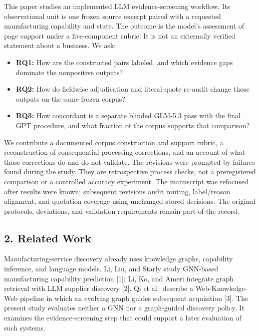 \documentclass[10pt]{article}
\providecommand{\tightlist}{\setlength{\itemsep}{0pt}\setlength{\parskip}{0pt}}
\begin{document}
This paper studies an implemented LLM evidence-screening workflow. Its observational unit is one frozen source excerpt paired with a requested manufacturing capability and state. The outcome is the model's assessment of page support under a five-component rubric. It is not an externally verified statement about a business. We ask:

\begin{itemize}
\tightlist
\item
  \textbf{RQ1:} How are the constructed pairs labeled, and which evidence gaps dominate the nonpositive outputs?
\item
  \textbf{RQ2:} How do fieldwise adjudication and literal-quote re-audit change those outputs on the same frozen corpus?
\item
  \textbf{RQ3:} How concordant is a separate blinded GLM-5.3 pass with the final GPT procedure, and what fraction of the corpus supports that comparison?
\end{itemize}

We contribute a documented corpus construction and support rubric, a reconstruction of consequential processing corrections, and an account of what those corrections do and do not validate. The revisions were prompted by failures found during the study. They are retrospective process checks, not a preregistered comparison or a controlled accuracy experiment. The manuscript was refocused after results were known; subsequent revisions audit routing, label/reason alignment, and quotation coverage using unchanged stored decisions. The original protocols, deviations, and validation requirements remain part of the record.

\hypertarget{related-work}{%
\subsection{2. Related Work}\label{related-work}}

Manufacturing-service discovery already uses knowledge graphs, capability inference, and language models. Li, Liu, and Starly study GNN-based manufacturing capability prediction {[}1{]}; Li, Ko, and Ameri integrate graph retrieval with LLM supplier discovery {[}2{]}. Qi et al.~describe a Web-Knowledge-Web pipeline in which an evolving graph guides subsequent acquisition {[}3{]}. The present study evaluates neither a GNN nor a graph-guided discovery policy. It examines the evidence-screening step that could support a later evaluation of such systems.
\end{document}
